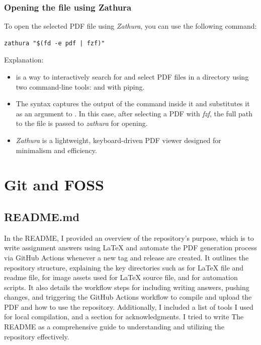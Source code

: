 \documentclass[titlepage]{article}
\begin{document}
\subsubsection{Opening the file using Zathura}
To open the selected PDF file using \textit{Zathura}, you can use the following command:
\begin{adjustwidth}{1cm}{1cm}
\begin{tcolorbox}[codebox]
\begin{lstlisting}[numbers=none]
zathura "$(fd -e pdf | fzf)"
\end{lstlisting}
\end{tcolorbox}
\end{adjustwidth}
Explanation:
\begin{itemize}
\item {} is a way to interactively search for and select PDF files in a directory using two command-line tools:  and  with piping.
\item {} The  syntax captures the output of the command inside it and substitutes it as an argument to .
In this case, after selecting a PDF with \textit{fzf}, the full path to the file is passed to \textit{zathura} for opening.
\item \textit{Zathura} is a lightweight, keyboard-driven PDF viewer designed for minimalism and efficiency.
\end{itemize}

\section{Git and FOSS}

\subsection{README.md}
In the README, I provided an overview of the repository's purpose, which is to write assignment answers using \LaTeX \hspace{0pt} and automate the PDF generation process via GitHub Actions whenever a new tag and release are created. It outlines the repository structure, explaining the key directories such as \tcbox[inline]{/} for \LaTeX \hspace{0pt} file and readme file,  for image assets used for \LaTeX \hspace{0pt} source file, and  for automation scripts. It also details the workflow steps for including writing answers, pushing changes, and triggering the GitHub Actions workflow to compile and upload the PDF and how to use the repository. Additionally, I included a list of tools I used for local compilation, and a section for acknowledgments. I tried to write The README as a comprehensive guide to understanding and utilizing the repository effectively.
\end{document}

